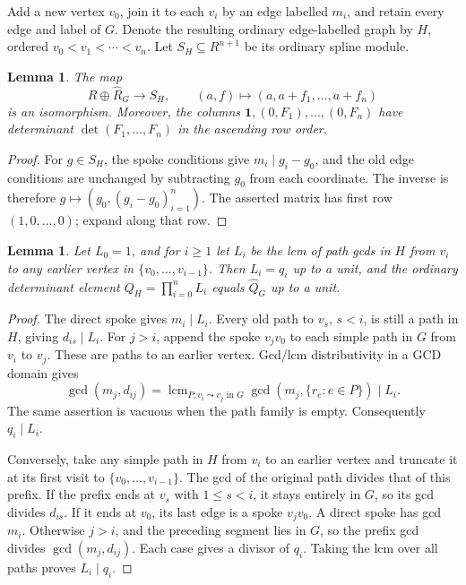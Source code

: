 \documentclass[11pt]{article}
\newtheorem{lemma}[theorem]{Lemma}
\newcommand{\lcmop}{\operatorname{lcm}}
\newcommand{\Sph}{\widehat R_G}
\begin{document}
Add a new vertex $v_0$, join it to each $v_i$ by an edge labelled $m_i$,
and retain every edge and label of $G$. Denote the resulting ordinary
edge-labelled graph by $H$, ordered $v_0<v_1<\cdots<v_n$.
Let $S_H\subseteq R^{n+1}$ be its ordinary spline module.

\begin{lemma}\label{lem:split}
The map
\[
 R\oplus\Sph\longrightarrow S_H,\qquad
 (a,f)\longmapsto(a,a+f_1,\ldots,a+f_n)
\]
is an isomorphism. Moreover, the columns
$\mathbf1,(0,F_1),\ldots,(0,F_n)$ have determinant
$\det(F_1,\ldots,F_n)$ in the ascending row order.
\end{lemma}
\begin{proof}
For $g\in S_H$, the spoke conditions give $m_i\mid g_i-g_0$,
and the old edge conditions are unchanged by subtracting $g_0$ from
each coordinate. The inverse is therefore
$g\mapsto(g_0,(g_i-g_0)_{i=1}^n)$.
The asserted matrix has first row $(1,0,\ldots,0)$; expand along that row.
\end{proof}

\begin{lemma}\label{lem:factors}
Let $L_0=1$, and for $i\geq1$ let $L_i$ be the lcm of path gcds in $H$
from $v_i$ to any earlier vertex in $\{v_0,\ldots,v_{i-1}\}$.
Then $L_i=q_i$ up to a unit, and the ordinary determinant element
$Q_H=\prod_{i=0}^n L_i$ equals $\widehat Q_G$ up to a unit.
\end{lemma}
\begin{proof}
The direct spoke gives $m_i\mid L_i$. Every old path to $v_s$, $s<i$,
is still a path in $H$, giving $d_{is}\mid L_i$.
For $j>i$, append the spoke $v_jv_0$ to each simple path in $G$
from $v_i$ to $v_j$. These are paths to an earlier vertex. Gcd/lcm
distributivity in a GCD domain gives
\[
 \gcd(m_j,d_{ij})
 =\lcmop_{P:v_i\leadsto v_j\text{ in }G}
       \gcd(m_j,\{r_e:e\in P\})\mid L_i.
\]
The same assertion is vacuous when the path family is empty.
Consequently $q_i\mid L_i$.

Conversely, take any simple path in $H$ from $v_i$ to an earlier vertex
and truncate it at its first visit to $\{v_0,\ldots,v_{i-1}\}$.
The gcd of the original path divides that of this prefix.
If the prefix ends at $v_s$ with $1\leq s<i$, it stays entirely in $G$,
so its gcd divides $d_{is}$. If it ends at $v_0$, its last edge is a
spoke $v_jv_0$. A direct spoke has gcd $m_i$. Otherwise $j>i$, and
the preceding segment lies in $G$, so the prefix gcd divides
$\gcd(m_j,d_{ij})$. Each case gives a divisor of $q_i$.
Taking the lcm over all paths proves $L_i\mid q_i$.
\end{proof}
\end{document}
